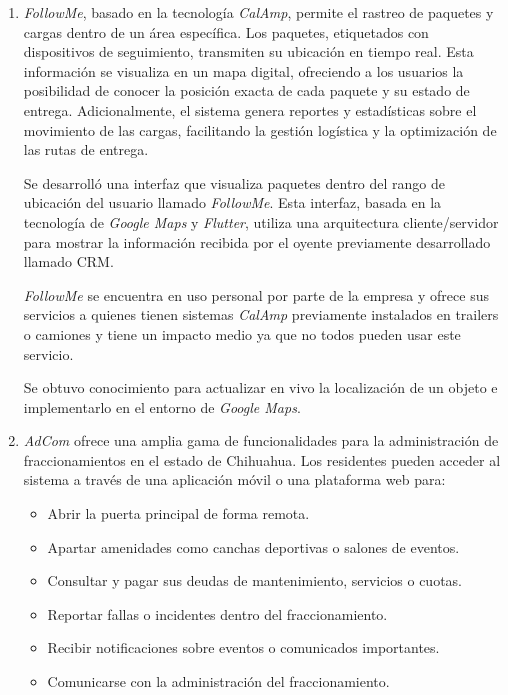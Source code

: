 \documentclass[protocolo.tex]{subfiles}
\begin{document}
\begin{enumerate}
\item \textit{FollowMe}, basado en la tecnología \textit{CalAmp}, permite el rastreo de paquetes y cargas dentro de un área específica. Los paquetes, etiquetados con dispositivos de seguimiento, transmiten su ubicación en tiempo real. Esta información se visualiza en un mapa digital,  ofreciendo a los usuarios la posibilidad de conocer la posición exacta de cada paquete y su estado de entrega. Adicionalmente, el sistema genera reportes y estadísticas sobre el movimiento de las cargas, facilitando la gestión logística y la optimización de las rutas de entrega.

Se desarrolló una interfaz que visualiza paquetes dentro del rango de ubicación del usuario llamado \textit{FollowMe}. Esta interfaz, basada en la tecnología de \textit{Google Maps} y \textit{Flutter}, utiliza una arquitectura cliente/servidor para mostrar la información recibida por el oyente previamente desarrollado llamado CRM.


\textit{FollowMe} se encuentra en uso personal por parte de la empresa y ofrece sus servicios a
quienes tienen sistemas \textit{CalAmp} previamente instalados en trailers o camiones y tiene un
impacto medio ya que no todos pueden usar este servicio.

Se obtuvo conocimiento para actualizar en vivo la localización de un objeto e implementarlo en el
entorno de \textit{Google Maps}.



\item \textit{AdCom} ofrece una amplia gama de funcionalidades para la  administración  de  fraccionamientos  en  el  estado  de  Chihuahua.  Los  residentes  pueden  acceder  al  sistema  a  través  de  una  aplicación  móvil  o  una  plataforma  web  para:

\begin{itemize}
\item Abrir la puerta principal de forma remota.
\item Apartar amenidades como canchas deportivas o salones de eventos.
\item Consultar y pagar sus deudas de mantenimiento, servicios o cuotas.
\item Reportar fallas o incidentes dentro del fraccionamiento.
\item Recibir notificaciones sobre eventos o comunicados importantes.
\item Comunicarse con la administración del fraccionamiento.
\end{itemize}


\end{enumerate}
\end{document}
